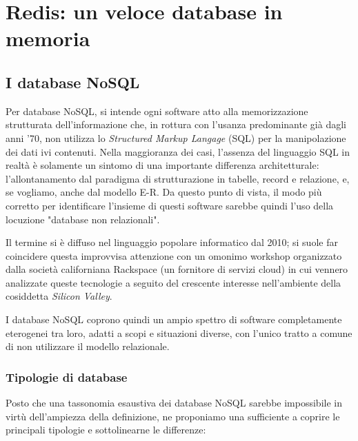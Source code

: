 \chapter{Redis: un veloce database in memoria}

\section{I database NoSQL}

Per database NoSQL, si intende ogni software atto alla memorizzazione strutturata dell'informazione
che, in rottura con l'usanza predominante già dagli anni '70, non utilizza lo \emph{Structured
Markup Langage} (SQL) per la manipolazione dei dati ivi contenuti. Nella maggioranza dei casi,
l'assenza del linguaggio SQL in realtà è solamente un sintomo di una importante differenza
architetturale: l'allontanamento dal paradigma di strutturazione in tabelle, record e relazione, e,
se vogliamo, anche dal modello E-R. Da questo punto di vista, il modo più corretto per identificare
l'insieme di questi software sarebbe quindi l'uso della locuzione "database non relazionali".

Il termine si è diffuso nel linguaggio popolare informatico dal 2010; si suole far
coincidere questa improvvisa attenzione con un omonimo workshop organizzato dalla società
californiana Rackspace (un fornitore di servizi cloud) in cui vennero analizzate
queste tecnologie a seguito del crescente interesse nell'ambiente della cosiddetta
\emph{Silicon Valley}.

I database NoSQL coprono quindi un ampio spettro di software completamente eterogenei
tra loro, adatti a scopi e situazioni diverse, con l'unico tratto a comune di non
utilizzare il modello relazionale.

\subsection{Tipologie di database}

Posto che una tassonomia esaustiva dei database NoSQL sarebbe impossibile in virtù
dell'ampiezza della definizione, ne proponiamo una \cite{corbellini} sufficiente a coprire le
principali tipologie e sottolinearne le differenze:

